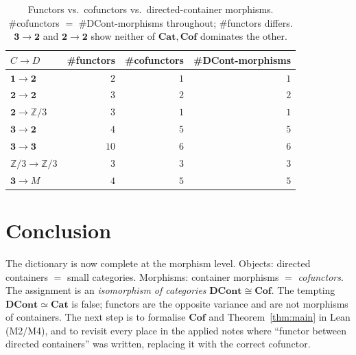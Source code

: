 \documentclass[11pt,a4paper]{article}
\newcommand{\Cat}{\mathbf{Cat}}
\newcommand{\Cof}{\mathbf{Cof}}
\newcommand{\DCont}{\mathbf{DCont}}
\theoremstyle{definition}\newtheorem{definition}{Definition}[section]
\theoremstyle{plain}\newtheorem{proposition}[definition]{Proposition}
\theoremstyle{remark}\newtheorem{example}[definition]{Example}
\begin{document}
\begin{table}[h]\centering
\begin{tabular}{lrrr}
\toprule
$C\to D$ & \#functors & \#cofunctors & \#DCont-morphisms\\
\midrule
$\mathbf1\to\mathbf2$ & $2$ & $1$ & $1$\\
$\mathbf2\to\mathbf2$ & $3$ & $2$ & $2$\\
$\mathbf2\to\mathbb Z/3$ & $3$ & $1$ & $1$\\
$\mathbf3\to\mathbf2$ & $4$ & $5$ & $5$\\
$\mathbf3\to\mathbf3$ & $10$ & $6$ & $6$\\
$\mathbb Z/3\to\mathbb Z/3$ & $3$ & $3$ & $3$\\
$\mathbf3\to M$ & $4$ & $5$ & $5$\\
\bottomrule
\end{tabular}
\caption{Functors vs.\ cofunctors vs.\ directed-container morphisms.
\#cofunctors $=$ \#DCont-morphisms throughout; \#functors differs.
$\mathbf3\to\mathbf2$ and $\mathbf2\to\mathbf2$ show neither of
$\Cat,\Cof$ dominates the other.}
\label{tab:counts}
\end{table}

\section{Conclusion}

The dictionary is now complete at the morphism level. Objects: directed
containers $=$ small categories. Morphisms: container morphisms $=$
\emph{cofunctors}. The assignment is an \emph{isomorphism of categories}
$\DCont\cong\Cof$. The tempting $\DCont\simeq\Cat$ is false; functors are the
opposite variance and are not morphisms of containers. The next step is to
formalise $\Cof$ and Theorem~\ref{thm:main} in Lean (M2/M4), and to revisit
every place in the applied notes where ``functor between directed containers''
was written, replacing it with the correct cofunctor.
\end{document}
